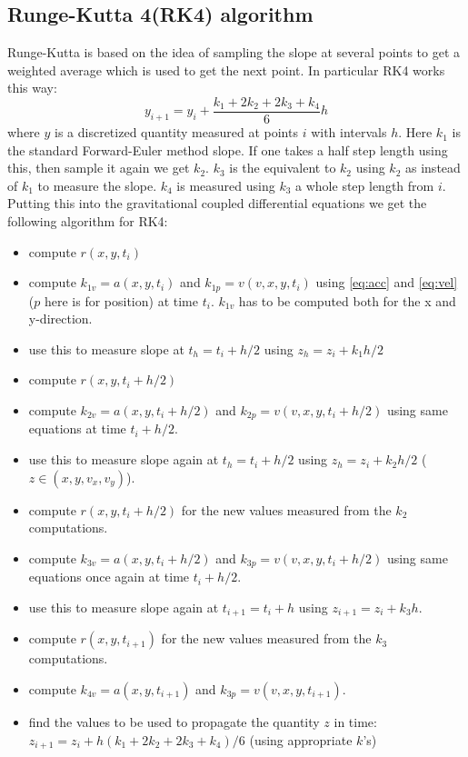 \documentclass{article} %
\begin{document}
\subsection{Runge-Kutta 4(RK4) algorithm}\label{ss:rk4}
Runge-Kutta is based on the idea of sampling the slope at several points to get a weighted average which is used to get the next point. 
In particular RK4 works this way:
\[y_{i+1}=y_i + \frac{k_1 +2k_2+2k_3+k_4}{6}h\] where $y$ is a discretized quantity measured at points $i$ with intervals $h$. Here $k_1$ is the standard 
Forward-Euler method slope. If one takes a half step length using this, then sample it again we get $k_2$. $k_3$ is the equivalent to $k_2$ using $k_2$ as
instead of $k_1$ to measure the slope. $k_4$ is measured using $k_3$ a whole step length from $i$. Putting this into the gravitational coupled differential
equations we get the following algorithm for RK4:
\begin{itemize}
 \item compute $r(x,y,t_i)$
 \item compute $k_{1v}=a(x,y,t_i)$ and $ k_{1p}=v(v,x,y,t_i)$ using \eqref{eq:acc} and \eqref{eq:vel}
  ($p$ here is for position) at time $t_i$. $k_{1v}$ has to be computed both for the x and y-direction.
 \item use this to measure slope at $t_h=t_i+h/2$ using $z_h=z_i+k_1h/2$
 \item compute $r(x,y,t_i+h/2)$
 \item compute $k_{2v}=a(x,y,t_i+h/2)$ and $ k_{2p}=v(v,x,y,t_i+h/2)$ using same equations at time $t_i+h/2$.
 \item use this to measure slope again at $t_h=t_i+h/2$ using $z_h=z_i+k_2h/2$ ($z\in(x,y,v_x,v_y)$). 
 \item compute $r(x,y,t_i+h/2)$ for the new values measured from the $k_2$ computations.
 \item compute $k_{3v}=a(x,y,t_i+h/2)$ and $ k_{3p}=v(v,x,y,t_i+h/2)$ using same equations once again at time $t_i+h/2$.
 \item use this to measure slope again at $t_{i+1}=t_i+h$ using $z_{i+1}=z_i+k_3h$.
 \item compute $r(x,y,t_{i+1})$ for the new values measured from the $k_3$ computations.
 \item compute $k_{4v}=a(x,y,t_{i+1})$ and $ k_{3p}=v(v,x,y,t_{i+1})$.
 \item find the values to be used to propagate the quantity $z$ in time: $z_{i+1}=z_i+h(k_1+2k_2+2k_3+k_4)/6$ (using appropriate $k$'s) 
\end{itemize}
\end{document}
